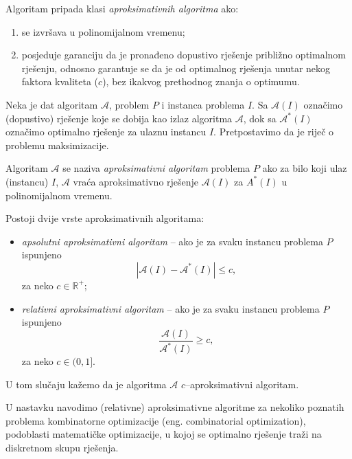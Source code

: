 \documentclass[b5paper, utf8, 11pt, colorlinks]{book}
\theoremstyle{definition}
\begin{document}
  \noindent Algoritam pripada klasi \emph{aproksimativnih algoritma} ako:
  \begin{enumerate}
  	\item se izvršava u polinomijalnom vremenu;
  	\item posjeduje garanciju da je pronađeno dopustivo rješenje približno optimalnom rješenju, odnosno garantuje se da je od optimalnog rješenja unutar nekog faktora kvaliteta ($c$), bez ikakvog prethodnog znanja o optimumu.
  \end{enumerate}
  Neka je dat algoritam $\mathcal{A}$, problem $P$ i instanca problema $I$. Sa $\mathcal{A}(I)$ označimo (dopustivo) rješenje koje se dobija kao izlaz algoritma $\mathcal{A}$, dok sa $\mathcal{A}^*(I)$ označimo optimalno rješenje za ulaznu instancu $I$. Pretpostavimo da je riječ o problemu maksimizacije. 
  
  Algoritam $\mathcal{A}$ se naziva \emph{aproksimativni algoritam} problema $P$ ako 
  za bilo koji ulaz (instancu) $I$, $\mathcal{A}$ vraća aproksimativno rješenje $\mathcal{A}(I)$ za $A^*(I)$ u polinomijalnom vremenu. 
  
  Postoji dvije vrste aproksimativnih algoritama:
  \begin{itemize}
  	\item \emph{apsolutni aproksimativni algoritam} -- ako je za svaku instancu problema $P$ ispunjeno
  	$$ |\mathcal{A}(I) - \mathcal{A}^*(I)| \leq c,$$ za neko $c\in \mathbb{R}^+$;
  	\item \emph{relativni aproksimativni algoritam} -- ako je   za svaku instancu problema $P$ ispunjeno
  	$$\frac{\mathcal{A}(I)}{\mathcal{A}^*(I)} \geq c,$$ za neko $c\in (0, 1]$.
  \end{itemize}
  
  
 U tom slučaju kažemo da je algoritma $\mathcal{A}$ $c$--aproksimativni algoritam.

  
  
   U nastavku navodimo  (relativne) aproksimativne algoritme za nekoliko poznatih problema kombinatorne optimizacije (eng. combinatorial optimization), podoblasti matematičke optimizacije, u kojoj se  optimalno rješenje traži na diskretnom skupu rješenja. 
  
\end{document}
